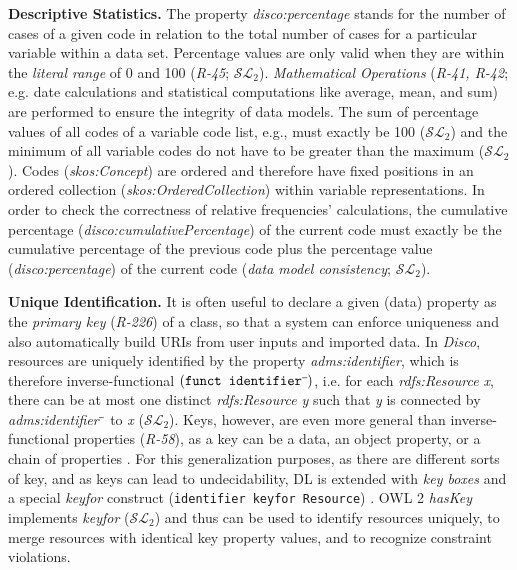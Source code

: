 \documentclass{llncs}
\newcommand{\ms}[1]{\texttt{#1}}
\begin{document}
{{\textbf{Descriptive Statistics.}
The property \emph{disco:percentage} stands for the number of cases of a given code in relation to the total number of cases for a particular variable within a data set.
Percentage values are only valid when they are within the \emph{literal range} of 0 and 100 (\emph{R-45}; $\mathcal{SL}_{2}$).
{\em Mathematical Operations} (\emph{R-41, R-42}; e.g. date calculations and statistical computations like average, mean, and sum) are performed to ensure the integrity of data models.
The sum of percentage values of all codes of a variable code list, e.g., must exactly be 100 ($\mathcal{SL}_{2}$)
and the minimum of all variable codes do not have to be greater than the maximum ($\mathcal{SL}_{2}$).
Codes (\emph{skos:Concept}) are ordered and therefore have fixed positions in an ordered collection (\emph{skos:OrderedCollection}) within variable representations.
In order to check the correctness of relative frequencies' calculations, the cumulative percentage (\emph{disco:cumulativePercentage}) of the current code must exactly be the cumulative percentage of the previous code
plus the percentage value (\emph{disco:percentage}) of the current code (\emph{data model consistency}; $\mathcal{SL}_{2}$).

\textbf{Unique Identification.}
It is often useful to declare a given (data) property as the \emph{primary key} (\emph{R-226}) of a class, so that a system can enforce uniqueness and also automatically build URIs from user inputs and imported data. 
In \emph{Disco}, resources are uniquely identified by the property \emph{adms:identifier},
which is therefore inverse-functional
$(\ms{funct identifier}\sp{\overline{\ }})$,
i.e. for each \emph{rdfs:Resource x}, there can be at most one distinct \emph{rdfs:Resource y} such that \emph{y} is connected by \emph{adms:identifier$\sp{\overline{\ }}$} to \emph{x} ($\mathcal{SL}_{2}$).
Keys, however, are even more general than inverse-functional properties (\emph{R-58}),
as a key can be a data, an object property, or a chain of properties \cite{Schneider2009}.
For this generalization purposes, as there are different sorts of key, and as keys can lead to undecidability, 
DL is extended with \emph{key boxes} and a special \emph{keyfor} construct (\ms{identifier \ms{keyfor} Resource}) \cite{Lutz2005}.
OWL 2 \emph{hasKey} implements \emph{keyfor} ($\mathcal{SL}_{2}$) and thus can be used to identify resources uniquely, to merge resources with identical key property values, and to recognize constraint violations.
%
%
%
%
%
%
%
%


}}
\end{document}

